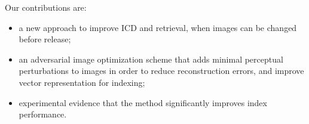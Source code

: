 Our contributions are:
\begin{itemize}[leftmargin=1cm,itemsep=0cm,topsep=-0.1cm]
    \item a new approach to improve ICD and retrieval, when images can be changed before release;
    \item an adversarial image optimization scheme that adds minimal perceptual perturbations to images in order to reduce reconstruction errors, and improve vector representation for indexing;
    \item experimental evidence that the method significantly improves index performance.
\end{itemize}
